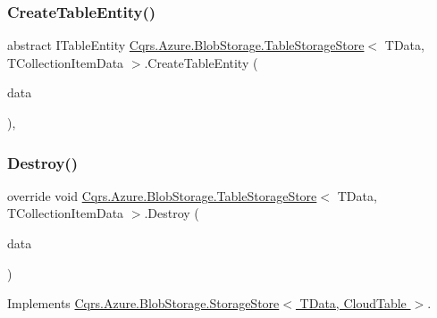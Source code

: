 \subsubsection{\texorpdfstring{Create\+Table\+Entity()}{CreateTableEntity()}}
{\footnotesize\ttfamily abstract I\+Table\+Entity \hyperlink{classCqrs_1_1Azure_1_1BlobStorage_1_1TableStorageStore}{Cqrs.\+Azure.\+Blob\+Storage.\+Table\+Storage\+Store}$<$ T\+Data, T\+Collection\+Item\+Data $>$.Create\+Table\+Entity (\begin{DoxyParamCaption}\item[{T\+Collection\+Item\+Data}]{data }\end{DoxyParamCaption})\hspace{0.3cm}{\ttfamily [protected]}, {}}

\mbox{\label{classCqrs_1_1Azure_1_1BlobStorage_1_1TableStorageStore_a1ad02e710a3fe1d794d99db332c351dc}} 
\subsubsection{\texorpdfstring{Destroy()}{Destroy()}\hspace{0.1cm}{\footnotesize\ttfamily [1/2]}}
{\footnotesize\ttfamily override void \hyperlink{classCqrs_1_1Azure_1_1BlobStorage_1_1TableStorageStore}{Cqrs.\+Azure.\+Blob\+Storage.\+Table\+Storage\+Store}$<$ T\+Data, T\+Collection\+Item\+Data $>$.Destroy (\begin{DoxyParamCaption}\item[{T\+Data}]{data }\end{DoxyParamCaption})\hspace{0.3cm}{\ttfamily [virtual]}}



Implements \hyperlink{classCqrs_1_1Azure_1_1BlobStorage_1_1StorageStore_a9879b4ab18c2a33d7e20bc0b3a734195}{Cqrs.\+Azure.\+Blob\+Storage.\+Storage\+Store$<$ T\+Data, Cloud\+Table $>$}.

\mbox{\label{classCqrs_1_1Azure_1_1BlobStorage_1_1TableStorageStore_a0b408504b9553b9c649b7186a382052a}} 
